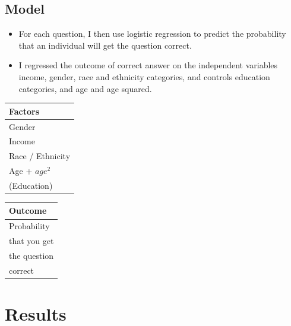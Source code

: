 \documentclass[]{article}
\begin{document}
\subsection{Model}
\begin{itemize}
  \item{For each question, I then use logistic regression to predict the probability that an individual will get the question correct.}
  \item{I regressed the outcome of correct answer on the independent variables income, gender, race and ethnicity categories, and controls education categories, and age and age squared.}
\end{itemize}

\begin{table}[ht]
\centering
    \begin{tabular}{l}  %
      \hline   %
      Factors          \\
      \hline   %
      Gender           \\
      Income           \\
      Race / Ethnicity \\
      Age + $age^2$    \\
      (Education)        \\
      \hline  %
    \end{tabular}
    \begin{tabular}{l}  %
       \hline   %
       Outcome        \\
       \hline   %
       Probability      \\
       that you get     \\
       the question     \\
       correct          \\
       \hline  %
     \end{tabular}
\end{table}



\newpage
\section{Results}\label{Results}
\end{document}
